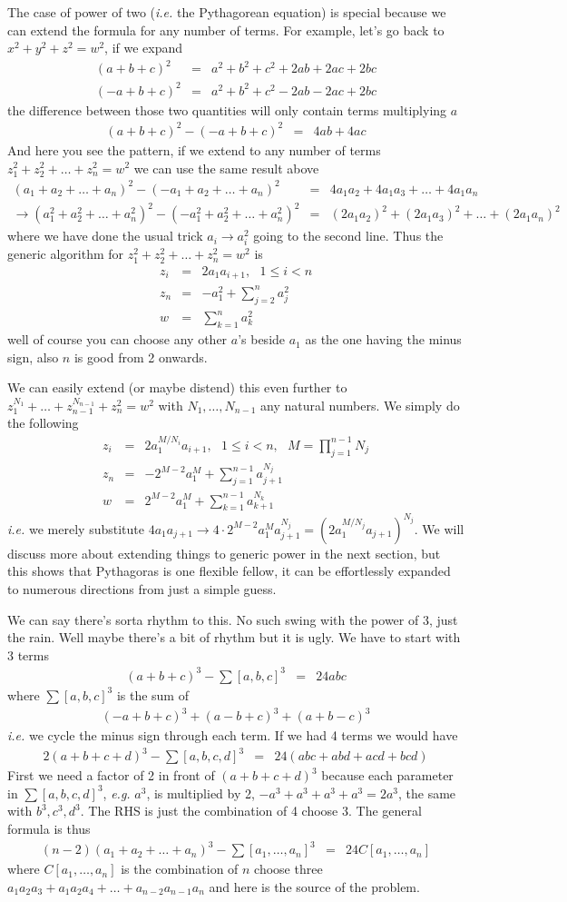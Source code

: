 \documentclass[aps,preprint,preprintnumbers,nofootinbib,showpacs,prd]{revtex4-1}
\newcommand{\ie}{{\it i.e.} }
\newcommand{\eg}{{\it e.g.} }
\newcommand{\nbea}{\begin{eqnarray*}}
\newcommand{\neea}{\end{eqnarray*}}
\begin{document}
The case of power of two (\ie the Pythagorean equation) is special because we can extend the formula for any number of terms. For example, let's go back to $x^2 + y^2 + z^2 = w^2$, if we expand
%
\nbea
(a+b+c)^2 & = & a^2 + b^2 + c^2 + 2ab + 2ac + 2bc \\
(-a+b+c)^2 & = & a^2 + b^2 + c^2 - 2ab - 2ac + 2bc
\neea
%
the difference between those two quantities will only contain terms multiplying $a$
%
\nbea
(a+b+c)^2 - (-a+b+c)^2 & = & 4ab + 4ac
\neea
%
And here you see the pattern, if we extend to any number of terms $z_1^2 + z_2^2 + \dots + z_n^2 = w^2$ we can use the same result above
%
\nbea
(a_1+a_2+ \dots +a_n)^2 - (-a_1+a_2+ \dots +a_n)^2 & = & 4a_1a_2 + 4a_1a_3 + \dots + 4 a_1a_n \\
\rightarrow (a_1^2+ a_2^2 + \dots +a_n^2)^2 - (-a_1^2 + a_2^2 + \dots + a_n^2)^2 & = & (2a_1a_2)^2 + (2a_1a_3)^2 + \dots + (2a_1a_n)^2
\neea
%
where we have done the usual trick $a_i \rightarrow a_i^2$ going to the second line. Thus the generic algorithm for $z_1^2 + z_2^2 + \dots + z_n^2 = w^2$ is
%
\nbea
z_i & = & 2 a_1 a_{i+1}, ~~~ 1 \le i < n \\
z_n & = & -a_1^2 + \sum_{j=2}^{n} a_j^2 \\
w & = & \sum_{k=1}^{n} a_k^2
\neea
%
well of course you can choose any other $a$'s beside $a_1$ as the one having the minus sign, also $n$ is good from 2 onwards.

We can easily extend (or maybe distend) this even further to $z_1^{N_1} + \dots + z_{n-1}^{N_{n-1}} + z_n^2 = w^2$ with $N_1, \dots, N_{n-1}$ any natural numbers. We simply do the following
%
\nbea
z_i & = & 2 a_1^{M/N_i} a_{i+1}, ~~~ 1 \le i < n, ~~~ M = \prod_{j=1}^{n-1} N_j \\
z_n & = & -2^{M-2}a_1^{M} + \sum_{j=1}^{n-1} a_{j+1}^{N_j} \\
w & = & 2^{M-2}a_1^{M} + \sum_{k=1}^{n-1} a_{k+1}^{N_k}
\neea
%
\ie we merely substitute $4a_1a_{j+1} \rightarrow 4 \cdot 2^{M-2} a_1^{M}a_{j+1}^{N_j} = (2 a_1^{M/N_j} a_{j+1})^{N_j}$. We will discuss more about extending things to generic power in the next section, but this shows that Pythagoras is one flexible fellow, it can be effortlessly expanded to numerous directions from just a simple guess.
 
We can say there's sorta rhythm to this. No such swing with the power of 3, just the rain. Well maybe there's a bit of rhythm but it is ugly. We have to start with 3 terms
%
\nbea
(a+b+c)^3 - \sum [a,b,c]^3 & = & 24 abc
\neea
%
where $\sum [a,b,c]^3$ is the sum of
%
\nbea
(-a+b+c)^3 + (a-b+c)^3 +(a+b-c)^3
\neea
%
\ie we cycle the minus sign through each term. If we had 4 terms we would have
%
\nbea
2(a+b+c+d)^3 - \sum [a,b,c,d]^3 & = & 24 (abc + abd + acd + bcd)
\neea
%
First we need a factor of 2 in front of $(a+b+c+d)^3$ because each parameter in $\sum [a,b,c,d]^3$, \eg $a^3$, is multiplied by 2, $-a^3 + a^3 + a^3 + a^3 = 2 a^3$, the same with $b^3,c^3,d^3$. The RHS is just the combination of 4 choose 3. The general formula is thus
%
\nbea
(n-2)(a_1+a_2+\dots +a_n)^3 - \sum [a_1, \dots , a_n]^3 & = & 24 C[a_1, \dots, a_n]
\neea
%
where $C[a_1, \dots, a_n]$ is the combination of $n$ choose three $a_1a_2a_3 + a_1a_2a_4 + \dots + a_{n-2}a_{n-1}a_{n}$ and here is the source of the problem.
\end{document}
